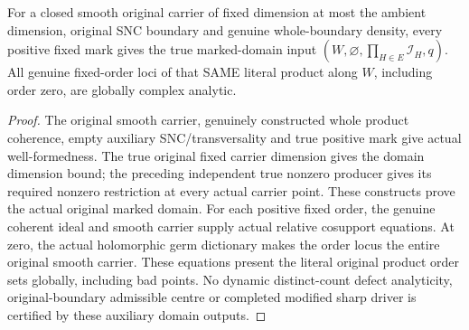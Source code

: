 \begin{theorem}
\label{hir:sharp-original-member-product-actual-marked-domain-global-order-loci}
\leanok
For a closed smooth original carrier of fixed dimension at most the
ambient dimension, original SNC boundary and genuine whole-boundary
density, every positive fixed mark gives the true marked-domain input
$(W,\varnothing,\prod_{H\in E}\mathcal I_H,q)$.
All genuine fixed-order loci of that SAME literal product along $W$,
including order zero, are globally complex analytic.
\end{theorem}
\begin{proof}
The original smooth carrier, genuinely constructed whole product
coherence, empty auxiliary SNC/transversality and true positive mark
give actual well-formedness. The true original fixed carrier dimension
gives the domain dimension bound; the preceding independent true
nonzero producer gives its required nonzero restriction at every actual
carrier point. These constructs prove the actual original marked domain.
For each positive fixed order, the genuine coherent ideal and smooth
carrier supply actual relative cosupport equations. At zero, the actual
holomorphic germ dictionary makes the order locus the entire original
smooth carrier. These equations present the literal original product
order sets globally, including bad points. No dynamic distinct-count
defect analyticity, original-boundary admissible centre or completed
modified sharp driver is certified by these auxiliary domain outputs.
\end{proof}
